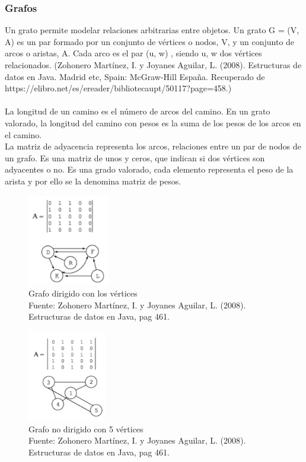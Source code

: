 \documentclass{article}
\begin{document}
\subsubsection{Grafos}
Un grato permite modelar relaciones arbitrarias entre objetos. Un grato G = (V, A) es un par formado por un conjunto de vértices o nodos, V, y un conjunto de arcos o aristas, A. Cada arco es el par (u, w) , siendo u, w dos vértices relacionados. (Zohonero Martínez, I. y Joyanes Aguilar, L. (2008). Estructuras de datos en Java. Madrid etc, Spain: McGraw-Hill España. Recuperado de https://elibro.net/es/ereader/bibliotecaupt/50117?page=458.)\\\\La longitud de un camino es el número de arcos del camino. En un grato valorado, la longitud del camino con pesos es la suma de los pesos de los arcos en el camino.\\La matriz de adyacencia representa los arcos, relaciones entre un par de nodos de un grafo. Es una matriz de unos y ceros, que indican si dos vértices son adyacentes o no. Es una grado valorado, cada elemento representa el peso de la arista y por ello se la denomina matriz de pesos.
\begin{figure}[ht]
    \centering     
    \includegraphics[height=4cm]{images/figura10.png}
    \caption{Grafo dirigido con los vértices\\Fuente: Zohonero Martínez,  I. y Joyanes Aguilar, L. (2008). Estructuras de datos en Java, pag 461.}
    \label{fig:BiasVoltager}
    
\end{figure}
\begin{figure}[ht]
    \centering     
    \includegraphics[height=4cm]{images/figura11.png}
    \caption{Grafo no dirigido con 5 vértices\\Fuente: Zohonero Martínez,  I. y Joyanes Aguilar, L. (2008). Estructuras de datos en Java, pag 461.}
    \label{fig:BiasVoltager}
    
\end{figure}
\end{document}
